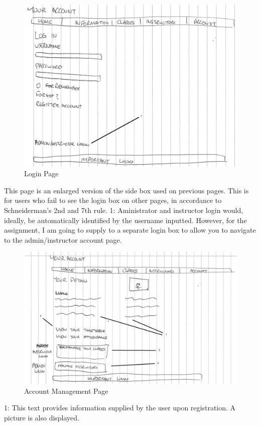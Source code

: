\documentclass[11pt, article]{article}
\begin{document}
			\begin{figure}[ht!]
	\includegraphics[scale=0.7]{images/loginpage}
 	\caption{Login Page}
	\end{figure}
	This page is an enlarged version of the side box used on previous pages. This is for users who fail to see the login box on other pages, in accordance to Schneiderman's 2nd and 7th rule.
	1: Aministrator and instructor login would, ideally, be automatically identified by the username inputted. However, for the assignment, I am going to supply to a separate login box to allow you to navigate to the admin/instructor account page.
	
	\newpage
			\begin{figure}[ht!]
	\includegraphics[scale=0.7]{images/loggedinaccpage}
 	\caption{Account Management Page}
	\end{figure}
	1: This text provides information supplied by the user upon registration. A picture is also displayed.
	
\end{document}
